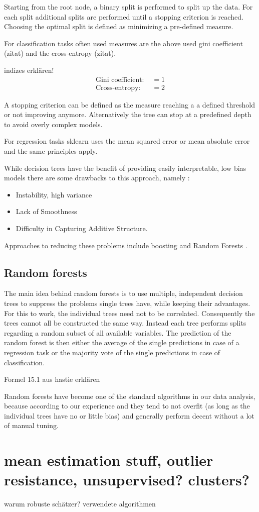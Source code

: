 Starting from the root node, a binary split is performed to
split up the data. For each split additional splits are performed
until a stopping criterion is reached.
Choosing the optimal split is defined as minimizing a
pre-defined measure.

For classification tasks often used measures
are the above used gini coefficient (zitat) and the
cross-entropy (zitat).

indizes erklären!
\begin{align}
	\text{Gini coefficient: } &= 1 \\
	\text{Cross-entropy: } &= 2
  \label{eq:03_gini_ce}
\end{align}

A stopping criterion can be defined as the measure reaching a
a defined threshold or not improving anymore.
Alternatively the tree can stop at a predefined depth to 
avoid overly complex models.

For regression tasks sklearn uses the mean squared error 
or mean absolute error and the same principles apply.

While decision trees have the benefit of providing
easily interpretable, low bias models there are some drawbacks to this
approach, namely \cite{hastie2017springer}:
\begin{itemize}
  \item{Instability, high variance}
  \item{Lack of Smoothness}
  \item{Difficulty in Capturing Additive Structure}.
\end{itemize}

Approaches to reducing these problems include
boosting \cite{freund1997decision} and Random Forests \cite{Breiman2001}.

\subsection{Random forests}
The main idea behind random forests is to use multiple, independent
decision trees to suppress the problems single trees have, while
keeping their advantages.
For this to work, the individual trees need not to be correlated.
Consequently the trees cannot all be constructed the same way.
Instead each tree performs splits regarding a random subset of all available variables.
The prediction of the random forest is then either the average of
the single predictions in case of a regression task or
the majority vote of the single predictions in case of classification.

Formel 15.1 aus hastie erklären

Random forests have become one of the standard algorithms
in our data analysis, because according to our
experience and \cite{hastie2017springer} they tend to
not overfit (as long as the individual trees have no or little bias)
and generally perform decent without a lot of manual tuning.


\section{mean estimation stuff, outlier resistance, unsupervised? clusters?}
warum robuste schätzer?
verwendete algorithmen
